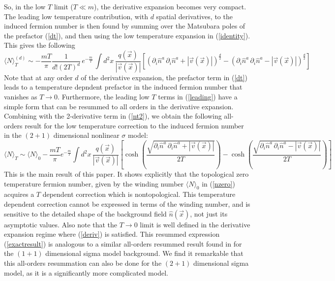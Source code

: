 \documentclass[a4paper,prd]{revtex4}
\begin{document}
So, in the low $T$ limit ($T\ll m$), the derivative expansion becomes
very compact. The leading low temperature contribution, with $d$ spatial
derivatives, to the induced fermion number is then found by summing over
the Matsubara poles of the prefactor (\ref{dt}), and then using the low
temperature expansion in (\ref{identity}). This gives the following
\begin{equation}
\langle N\rangle_T^{(d)}\sim -
\frac{mT}{\pi} \frac{1}{d! (2T)^d}\,e^{-\frac{m}{T}}\,\int d^2 x\,
\frac{q(\vec{x})}{|\vec{v}(\vec{x})|}\left[\left(\partial_{i} \hat{n}^a \,\partial_{i} \hat{n}^a
+|\vec{v}(\vec{x})|\right)^{\frac{d}{2}}-\left(\partial_{i}\hat{n}^a \, \partial_{i}\hat{n}^a
-|\vec{v}(\vec{x})|\right)^{\frac{d}{2}}\right]
\label{leading}
\end{equation}
Note that at any order $d$ of the derivative expansion, the prefactor term
in (\ref{dt}) leads to a temperature depndent prefactor in the induced
fermion number that vanishes as $T\to 0$. Furthermore, the leading low
$T$ terms in (\ref{leading}) have a simple form that can be resummed to
all orders in the derivative expansion. Combining with the 2-derivative
term in (\ref{nt2}), we obtain the following all-orders result for the low
temperature correction to the induced fermion number in the $(2+1)$
dimensional  nonlinear
$\sigma$ model:
\begin{equation}
\langle N\rangle _{T} \sim \langle N\rangle _{0} -
\frac{m T}{\pi} e^{-\frac{m}{T}}\int d^{2}x \, \frac{q(\vec{x})}{|\vec{v}(\vec{x})|}\left[
\cosh\left(\frac{\sqrt{\partial_{i}\hat{n}^a\, \partial_{i}\hat{n}^a +|\vec{v}(\vec{x})|}}{2
T}\right) -\cosh \left(\frac{\sqrt{\partial_{i}\hat{n}^a\, \partial_{i}\hat{n}^a
-|\vec{v}(\vec{x})|}}{2 T}\right)\right]
\label{exactresult}
\end{equation}
This is the main result of this paper. It shows explicitly that the 
topological zero temperature fermion number, given by the winding number $\langle
N\rangle _{0}$ in (\ref{nzero}) acquires a $T$ dependent correction which
is nontopological. This temperature dependent correction cannot be
expressed in terms of the winding number, and is sensitive to the
detailed shape of the background field $\hat{n}(\vec{x})$, not just its
asymptotic values. Also note that the $T\to 0$ limit is well defined
in the derivative expansion regime where (\ref{deriv}) is satisfied. This
resummed expression (\ref{exactresult}) is analogous to a similar
all-orders resummed result found in \cite{ad} for the $(1+1)$ dimensional
sigma model background. We find it remarkable that this all-orders
resummation can also be done for the $(2+1)$ dimensional sigma model, as
it is a significantly more complicated model.
\end{document}
